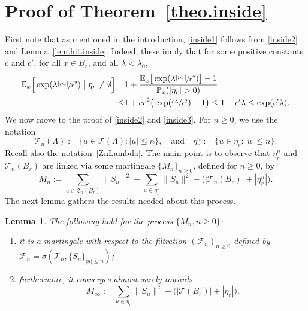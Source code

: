 \documentclass[JEP,XML,SOM,Unicode,NoFloatCountersInSection,published]{cedram}
\theoremstyle{plain}
\newtheorem{lemma}[theorem]{Lemma}
\theoremstyle{definition}
\newcommand{\1}{{\text{\Large $\mathfrak 1$}}}
\begin{document}
\section{Proof of Theorem~\ref{theo.inside}}\label{sec-inside}
First note that as mentioned in the introduction,
\eqref{inside1} follows from \eqref{inside2} and Lemma~\ref{lem.hit.inside}.
Indeed, these imply that for some positive constants $c$ and $c'$,
for all $x\in B_r$, and all $\lambda<\lambda_0$,
\begin{equation*}
\begin{split}
\mathbb E_x\Big[\exp(\lambda \sfrac{|\eta_r|}{r^2})
\bigm| \eta_r\neq \emptyset\Big]
=& 1+\frac{\mathbb E_x\big[\exp(\lambda \sfrac{|\eta_r|}{r^2})\big]
-1}{\mathbb P_x(|\eta_r|>0)} \\
\le& 1+ cr^2 \big(\exp(\sfrac{c\lambda}{r^2}) - 1\big) \le
1+c'\lambda \le \exp(c'\lambda).
\end{split}
\end{equation*}
We now move to the proof of \eqref{inside2} and \eqref{inside3}.
For $n\ge 0$, we use the notation
\[
\mathcal T_n(\Lambda):=
\{u\in \mathcal T(\Lambda): |u|\le n\}, \quad\text{and}\quad
\eta^n_r:=\{u\in \eta_r: |u|\le n\}.
\]
Recall also the notation~\eqref{ZnLambda}.
The main point is to observe that $\eta^n_r$ and $\mathcal T_n(B_r)$
are linked via some martingale $\{M_n\}_{n\ge 0}$, defined for $n\ge 0$, by
\begin{equation*}%
M_n:= \sum_{u\in \mathcal Z_n(B_r)}
\|S_u\|^2 + \sum_{u\in \eta^n_r} \|S_u\|^2-
\big(|\mathcal T_n(B_r)|+|\eta^n_r|\big).
\end{equation*}
The next lemma gathers the results needed about this process.
\begin{lemma}\label{lem.M}
The following hold for the process $\{M_n, n\ge 0\}$:
\begin{enumerate}
\item it is a martingale with respect to the
filtration $(\mathcal F_n)_{n\ge 0}$ defined by
$\mathcal F_n \!=\! \sigma(\mathbf{\mathcal T}_n, \{S_u\}_{|u|\le n})$;
\item furthermore, it converges almost surely towards
\[
M_\infty := \sum_{u\in \eta_r} \|S_u\|^2-
\big(|\mathbf{\mathcal T}(B_r)|+
|\eta_r|\big).
\]
\end{enumerate}
\end{lemma}
\end{document}
